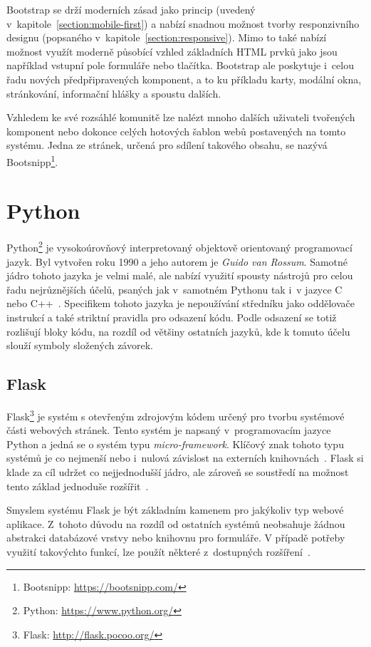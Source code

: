 Bootstrap se drží moderních zásad jako princip  (uvedený v~kapitole~\ref{section:mobile-first}) a nabízí snadnou možnost tvorby responzivního designu (popsaného v~kapitole~\ref{section:responsive}). Mimo to také nabízí možnost využít moderně působící vzhled základních HTML prvků jako jsou například vstupní pole formuláře nebo tlačítka. Bootstrap ale poskytuje i~celou řadu nových předpřipravených komponent, a to ku příkladu karty, modální okna, stránkování, informační hlášky a spoustu dalších.

Vzhledem ke své rozsáhlé komunitě lze nalézt mnoho dalších uživateli tvořených komponent nebo dokonce celých hotových šablon webů postavených na tomto systému. Jedna ze stránek, určená pro sdílení takového obsahu, se nazývá Bootsnipp\footnote{Bootsnipp: \url{https://bootsnipp.com/}}.



\section{Python}
Python\footnote{Python: \url{https://www.python.org/}} je vysokoúrovňový interpretovaný objektově orientovaný programovací jazyk. Byl vytvořen roku 1990 a jeho autorem je \emph{Guido van Rossum}. Samotné jádro tohoto jazyka je velmi malé, ale nabízí využití spousty nástrojů pro celou řadu nejrůznějších účelů, psaných jak v~samotném Pythonu tak i~v jazyce C nebo C++~\cite{bib:python}. Specifikem tohoto jazyka je nepoužívání středníku jako oddělovače instrukcí a také striktní pravidla pro odsazení kódu. Podle odsazení se totiž rozlišují bloky kódu, na rozdíl od většiny ostatních jazyků, kde k tomuto účelu slouží symboly složených závorek. 


\subsection{Flask}
Flask\footnote{Flask: \url{http://flask.pocoo.org/}} je systém s otevřeným zdrojovým kódem určený pro tvorbu systémové části webových stránek. Tento systém je napsaný v~programovacím jazyce Python a jedná se o systém typu \emph{micro-framework}. Klíčový znak tohoto typu systémů je co nejmenší nebo i~nulová závislost na externích knihovnách~\cite{bib:flask-doc}.
Flask si klade za cíl udržet co nejjednodušší jádro, ale zároveň se soustředí na možnost tento základ jednoduše rozšířit~\cite{bib:flask-pym}.

Smyslem systému Flask je být základním kamenem pro jakýkoliv typ webové aplikace. Z~tohoto důvodu na rozdíl od ostatních systémů neobsahuje žádnou abstrakci databázové vrstvy nebo knihovnu pro formuláře. V případě potřeby využití takovýchto funkcí, lze použít některé z~dostupných rozšíření~\cite{bib:flask-design}.

